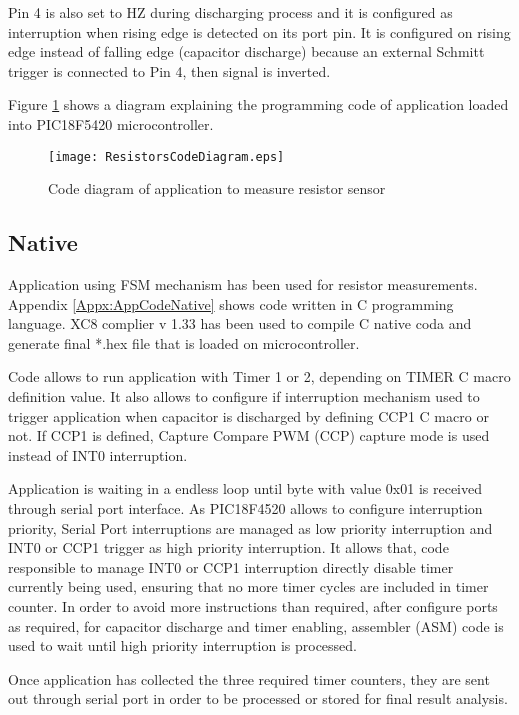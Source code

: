 Pin 4 is also set to HZ during discharging process and it is configured as interruption when rising edge is detected on its port pin. It is configured on rising edge instead of falling edge (capacitor discharge) because an external Schmitt trigger is connected to Pin 4, then signal is inverted.
\medskip

Figure \ref{fig:ResistorsCodeDiagram} shows a diagram explaining the programming code of application loaded into PIC18F5420 microcontroller.
\medskip

\begin{figure}[!ht]
\centering
\texttt{[image: ResistorsCodeDiagram.eps]}
\caption{Code diagram of application to measure resistor sensor}
\label{fig:ResistorsCodeDiagram}
\end{figure}

\subsection{Native}\label{SS:Res:Code:Native}
Application using FSM mechanism has been used for resistor measurements. Appendix \ref{Appx:AppCodeNative} shows code written in C programming language. XC8 complier v 1.33 has been used to compile C native coda and generate final *.hex file that is loaded on microcontroller.

Code allows to run application with Timer 1 or 2, depending on TIMER C macro definition value. It also allows to configure if interruption mechanism used to trigger application when capacitor is discharged by defining CCP1 C macro or not. If CCP1 is defined, Capture Compare PWM (CCP) capture mode is used instead of INT0 interruption.

Application is waiting in a endless loop until byte with value 0x01 is received through serial port interface. As PIC18F4520 allows to configure interruption priority, Serial Port interruptions are managed as low priority interruption and INT0 or CCP1 trigger as high priority interruption. It allows that, code responsible to manage INT0 or CCP1 interruption directly disable timer currently being used, ensuring that no more timer cycles are included in timer counter. In order to avoid more instructions than required, after configure ports as required, for capacitor discharge and timer enabling, assembler (ASM) code is used to wait until high priority interruption is processed.

Once application has collected the three required timer counters, they are sent out through serial port in order to be processed or stored for final result analysis.

